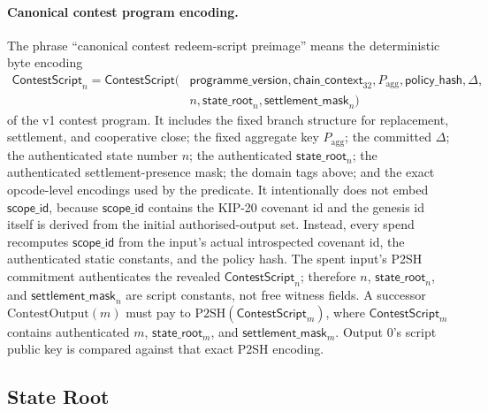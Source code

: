 \documentclass[10pt,a4paper]{article}
\begin{document}
\paragraph{Canonical contest program encoding.}
The phrase ``canonical contest redeem-script preimage'' means the deterministic byte encoding
\[
  \begin{aligned}
  \mathsf{ContestScript}_n =
  \mathsf{ContestScript}(&\mathsf{programme\_version},\mathsf{chain\_context}_{32},
  P_{\mathrm{agg}},\mathsf{policy\_hash},\Delta,\\
  &n,\mathsf{state\_root}_n,\mathsf{settlement\_mask}_n)
  \end{aligned}
\]
of the v1 contest program. It includes the fixed branch structure for replacement, settlement, and cooperative close; the fixed aggregate key $P_{\mathrm{agg}}$; the committed $\Delta$; the authenticated state number $n$; the authenticated $\mathsf{state\_root}_n$; the authenticated settlement-presence mask; the domain tags above; and the exact opcode-level encodings used by the predicate. It intentionally does not embed $\mathsf{scope\_id}$, because $\mathsf{scope\_id}$ contains the KIP-20 covenant id and the genesis id itself is derived from the initial authorised-output set. Instead, every spend recomputes $\mathsf{scope\_id}$ from the input's actual introspected covenant id, the authenticated static constants, and the policy hash. The spent input's P2SH commitment authenticates the revealed $\mathsf{ContestScript}_n$; therefore $n$, $\mathsf{state\_root}_n$, and $\mathsf{settlement\_mask}_n$ are script constants, not free witness fields. A successor $\mathrm{ContestOutput}(m)$ must pay to $\mathrm{P2SH}(\mathsf{ContestScript}_m)$, where $\mathsf{ContestScript}_m$ contains authenticated $m$, $\mathsf{state\_root}_m$, and $\mathsf{settlement\_mask}_m$. Output 0's script public key is compared against that exact P2SH encoding.

\subsection{State Root}
\label{sec:state-root}
\end{document}
